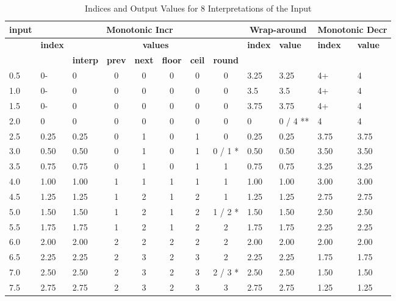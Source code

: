 \documentclass[11pt,fleqn]{report}
\begin{document}
\begin{table}[ht]
\caption{Indices and Output Values for 8 Interpretations of the Input}
\begin{center}
\footnotesize  %
\begin{tabular}{|l||l|l|c|c|c|c|c||l|l||l|l||}
\hline
\textbf{input} &
\multicolumn{7}{c||}{\textbf{Monotonic Incr}} &
\multicolumn{2}{c||}{\textbf{Wrap-around}} &
\multicolumn{2}{c||}{\textbf{Monotonic Decr}}\\
\hline
 & \textbf{index} &
\multicolumn{6}{c||}{\textbf{values}} &
\textbf{index} &
\textbf{value} &
\textbf{index} &
\textbf{value} \\
\hline
 & &
\textbf{interp} &
\textbf{prev} &
\textbf{next} &
\textbf{floor} &
\textbf{ceil} &
\textbf{round} & & & & \\
\hline \hline
0.5  & 0-   & 0    & 0 & 0 & 0 & 0 & 0       & 3.25 & 3.25     & 4+   & 4 \\
1.0  & 0-   & 0    & 0 & 0 & 0 & 0 & 0       & 3.5  & 3.5      & 4+   & 4 \\
1.5  & 0-   & 0    & 0 & 0 & 0 & 0 & 0       & 3.75 & 3.75     & 4+   & 4 \\
2.0  & 0    & 0    & 0 & 0 & 0 & 0 & 0       & 0    & 0 / 4 ** & 4    & 4 \\
2.5  & 0.25 & 0.25 & 0 & 1 & 0 & 1 & 0       & 0.25 & 0.25     & 3.75 & 3.75 \\
3.0  & 0.50 & 0.50 & 0 & 1 & 0 & 1 & 0 / 1 * & 0.50 & 0.50     & 3.50 & 3.50 \\
3.5  & 0.75 & 0.75 & 0 & 1 & 0 & 1 & 1       & 0.75 & 0.75     & 3.25 & 3.25 \\
4.0  & 1.00 & 1.00 & 1 & 1 & 1 & 1 & 1       & 1.00 & 1.00     & 3.00 & 3.00 \\
4.5  & 1.25 & 1.25 & 1 & 2 & 1 & 2 & 1       & 1.25 & 1.25     & 2.75 & 2.75 \\
5.0  & 1.50 & 1.50 & 1 & 2 & 1 & 2 & 1 / 2 * & 1.50 & 1.50     & 2.50 & 2.50 \\
5.5  & 1.75 & 1.75 & 1 & 2 & 1 & 2 & 2       & 1.75 & 1.75     & 2.25 & 2.25 \\
6.0  & 2.00 & 2.00 & 2 & 2 & 2 & 2 & 2       & 2.00 & 2.00     & 2.00 & 2.00 \\
6.5  & 2.25 & 2.25 & 2 & 3 & 2 & 3 & 2       & 2.25 & 2.25     & 1.75 & 1.75 \\
7.0  & 2.50 & 2.50 & 2 & 3 & 2 & 3 & 2 / 3 * & 2.50 & 2.50     & 1.50 & 1.50 \\
7.5  & 2.75 & 2.75 & 2 & 3 & 2 & 3 & 3       & 2.75 & 2.75     & 1.25 & 1.25 \\

\end{tabular}
\end{center}
\end{table}
\end{document}
